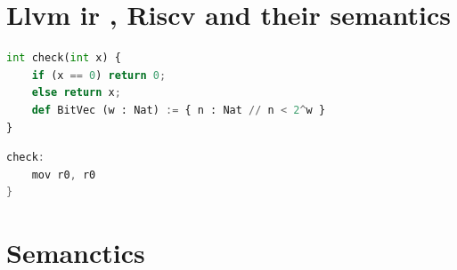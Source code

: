 \section{Llvm ir , Riscv and their semantics} 


\noindent
\begin{minipage}{0.6\textwidth}
\begin{lstlisting}[language=Python, caption=unoptimized]
int check(int x) {						        
	if (x == 0) return 0; 					
    else return x;
    def BitVec (w : Nat) := { n : Nat // n < 2^w }
}
\end{lstlisting}
\end{minipage}
\hfill
\begin{minipage}{0.45\textwidth}
\begin{lstlisting}[language=C, caption= optimzed assembly]
check: 
    mov r0, r0
}
\end{lstlisting}
\end{minipage}


\section {Semanctics}

